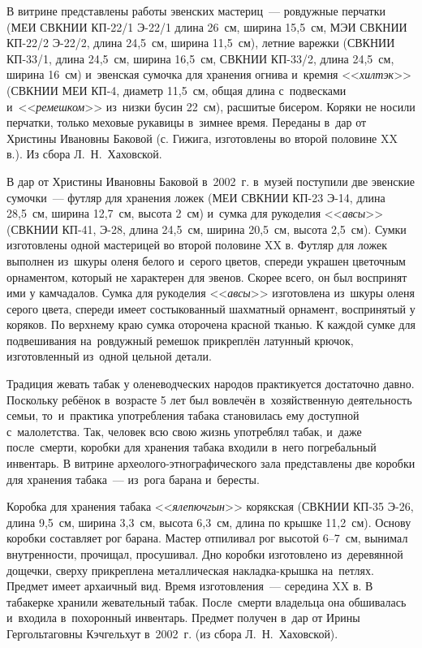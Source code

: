 В витрине представлены работы эвенских мастериц~--- ровдужные перчатки (МЕИ СВКНИИ КП-22/1 Э-22/1 длина 26~см, ширина 15,5~см, МЭИ СВКНИИ КП-22/2 Э-22/2, длина 24,5~см, ширина 11,5~см), летние варежки (СВКНИИ КП-33/1, длина 24,5~см, ширина 16,5~см, СВКНИИ КП-33/2, длина 24,5~см, ширина 16~см) и~эвенская сумочка для хранения огнива и~кремня <<\textit{хилтэк}>> (СВКНИИ МЕИ КП-4, диаметр 11,5~см, общая длина с~подвесками и~<<\textit{ремешком}>> из~низки бусин 22~см), расшитые бисером. Коряки не носили перчатки, только меховые рукавицы в~зимнее время. Переданы в~дар от Христины Ивановны Баковой (с. Гижига, изготовлены во второй половине XX в.). Из сбора Л.~Н.~Хаховской.

В дар от Христины Ивановны Баковой в~2002~г. в~музей поступили две эвенские сумочки~--- футляр для хранения ложек (МЕИ СВКНИИ КП-23 Э-14, длина 28,5~см, ширина 12,7~см, высота 2~см) и~сумка для рукоделия <<\textit{авсы}>> (СВКНИИ КП-41, Э-28, длина 24,5~см, ширина 20,5~см, высота 2,5~см). Сумки изготовлены одной мастерицей во второй половине XX в. Футляр для ложек выполнен из~шкуры оленя белого и~серого цветов, спереди украшен цветочным орнаментом, который не характерен для эвенов. Скорее всего, он был воспринят ими у камчадалов. Сумка для рукоделия <<\textit{авсы}>> изготовлена из~шкуры оленя серого цвета, спереди имеет состыкованный шахматный орнамент, воспринятый у коряков. По верхнему краю сумка оторочена красной тканью. К каждой сумке для подвешивания на~ровдужный ремешок прикреплён латунный крючок, изготовленный из~одной цельной детали.

Традиция жевать табак у оленеводческих народов практикуется достаточно давно. Поскольку ребёнок в~возрасте 5 лет был вовлечён в~хозяйственную деятельность семьи, то~и~практика употребления табака становилась ему доступной с~малолетства. Так, человек всю свою жизнь употреблял табак, и~даже после~смерти, коробки для хранения табака входили в~него погребальный инвентарь. В витрине археолого-этнографического зала представлены две коробки для хранения табака~--- из~рога барана и~бересты.

Коробка для хранения табака <<\textit{ялепючгын}>> корякская (СВКНИИ КП-35 Э-26, длина 9,5~см, ширина 3,3~см, высота 6,3~см, длина по крышке 11,2~см). Основу коробки составляет рог барана. Мастер отпиливал рог высотой 6--7~см, вынимал внутренности, прочищал, просушивал. Дно коробки изготовлено из~деревянной дощечки, сверху прикреплена металлическая накладка-крышка на~петлях. Предмет имеет архаичный вид. Время изготовления~--- середина XX в. В табакерке хранили жевательный табак. После~смерти владельца она обшивалась и~входила в~похоронный инвентарь. Предмет получен в~дар от Ирины Гергольтаговны Кэчгельхут в~2002~г. (из сбора Л.~Н.~Хаховской).


